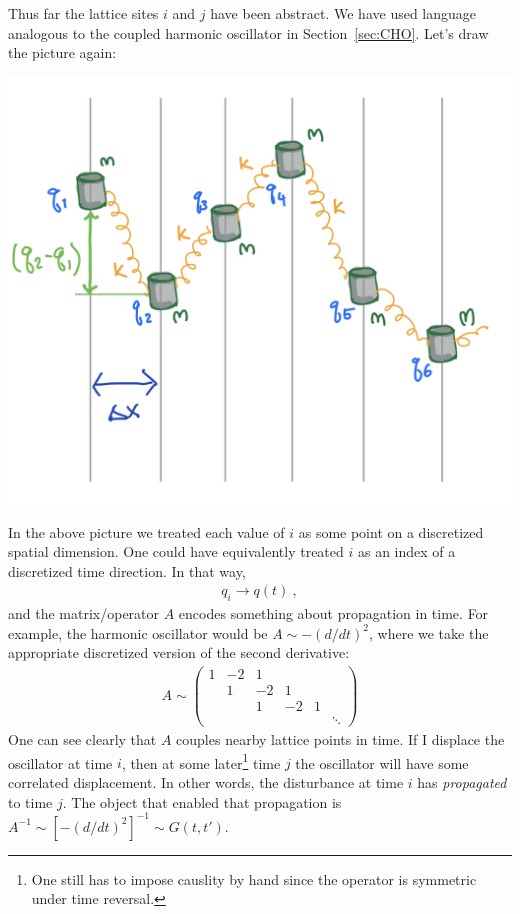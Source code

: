 Thus far the lattice sites $i$ and $j$ have been abstract. We have used language analogous to the coupled harmonic oscillator in Section~\ref{sec:CHO}. Let's draw the picture again: 
\begin{center}
\includegraphics[width=.5\textwidth]{figures/coupledHO.jpg}
\end{center}
In the above picture we treated each value of $i$ as some point on a discretized spatial dimension. One could have equivalently treated $i$ as an index of a discretized time direction. In that way,
\begin{align}
	q_i \to q(t) \ ,
\end{align}
and the matrix/operator $A$ encodes something about propagation in time. For example, the harmonic oscillator would be $A \sim -(d/dt)^2$, where we take the appropriate discretized version of the second derivative:
\begin{align}
	A \sim 
	\begin{pmatrix}
	1 	& -2 & 1  &    &   &\\
		& 1  & -2 & 1  &   &\\
		&	 & 1  & -2 & 1 &\\
		&	&	&	&	& \ddots
	\end{pmatrix}
\end{align}
One can see clearly that $A$ couples nearby lattice points in time. If I displace the oscillator at time $i$, then at some later\footnote{One still has to impose causlity by hand since the operator is symmetric under time reversal.} time $j$ the oscillator will have some correlated displacement. In other words, the disturbance at time $i$ has \emph{propagated} to time $j$. The object that enabled that propagation is $A^{-1} \sim [-(d/dt)^2]^{-1} \sim G(t,t')$. 

